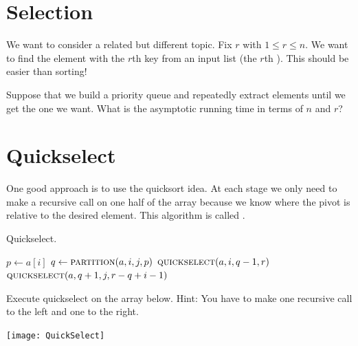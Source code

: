 \section{Selection}
We want to consider a related but different topic. Fix $r$ with $1\leq r \leq n$. 
We want to find the element with the $r$th key from an input list (the $r$th ). 
This should be easier than sorting! 

\begin{Boxample}[5]
Suppose that we build a priority queue and repeatedly extract elements until we get the one we want.
What is the asymptotic running time in terms of $n$ and $r$?

\end{Boxample}

\section{Quickselect}
One good approach is to use the quicksort idea. At each stage we only need to 
make a recursive call on one half of the array because we know where the pivot 
is relative to the desired element. This algorithm is called .

\begin{algorithm}[H]
  \caption{Quickselect.}
  \label{alg:quickselect}
\begin{algorithmic}[0]
		\State $p \gets a[i]$ 
		\State $q \gets \Call{partition}{a, i,j,p}$ 
			\State {}
			\State $\Call{quickselect}{a,i,q-1,r}$ 
		\Else{}
			\State $\Call{quickselect}{a,q+1,j,r-q+i-1}$ 
		\EndIf
	\EndIf
\EndFunction  
\end{algorithmic}
\end{algorithm}

\begin{Boxample}[1]
Execute quickselect on the array below. Hint: You have to make one recursive call to the left and one to the right.
\begin{center}
\texttt{[image: QuickSelect]} 
\end{center}
\end{Boxample}



